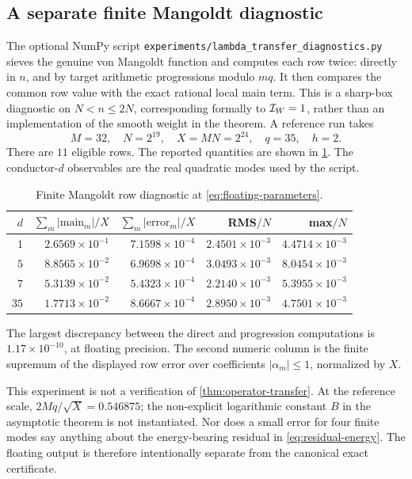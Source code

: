 \subsection{A separate finite Mangoldt diagnostic}

The optional NumPy script
\texttt{experiments/lambda\_transfer\_diagnostics.py} sieves the genuine
von Mangoldt function and computes each row twice: directly in $n$, and by
target arithmetic progressions modulo $mq$.  It then compares the common
row value with the exact rational local main term.  This is a sharp-box
diagnostic on $N<n\leq2N$, corresponding formally to $\mathcal I_W=1$, rather than
an implementation of the smooth weight in the theorem.  A reference run takes
\begin{equation}\label{eq:floating-parameters}
 M=32,
 \quad N=2^{19},
 \quad X=MN=2^{24},
 \quad q=35,
 \quad h=2.
\end{equation}
There are $11$ eligible rows.  The reported quantities are shown in
\cref{tab:floating-diagnostic}.  The conductor-$d$ observables are the real
quadratic modes used by the script.

\begin{table}[ht]
\centering
\caption{Finite Mangoldt row diagnostic at \eqref{eq:floating-parameters}.}
\label{tab:floating-diagnostic}
\begin{tabular}{@{}rrrrr@{}}
\toprule
$d$ & $\sum_m|\text{main}_m|/X$
    & $\sum_m|\text{error}_m|/X$
    & RMS$/N$ & max$/N$\\
\midrule
$1$  & $2.6569\times10^{-1}$ & $7.1598\times10^{-4}$
     & $2.4501\times10^{-3}$ & $4.4714\times10^{-3}$\\
$5$  & $8.8565\times10^{-2}$ & $6.9698\times10^{-4}$
     & $3.0493\times10^{-3}$ & $8.0454\times10^{-3}$\\
$7$  & $5.3139\times10^{-2}$ & $5.4323\times10^{-4}$
     & $2.2140\times10^{-3}$ & $5.3955\times10^{-3}$\\
$35$ & $1.7713\times10^{-2}$ & $8.6667\times10^{-4}$
     & $2.8950\times10^{-3}$ & $4.7501\times10^{-3}$\\
\bottomrule
\end{tabular}
\end{table}

The largest discrepancy between the direct and progression computations is
$1.17\times10^{-10}$, at floating precision.  The second numeric column is
the finite supremum of the displayed row error over coefficients
$|\alpha_m|\leq1$, normalized by $X$.

This experiment is not a verification of
\cref{thm:operator-transfer}.  At the reference scale,
$2Mq/\sqrt X=0.546875$; the non-explicit logarithmic constant $B$ in the
asymptotic theorem is not instantiated.  Nor does a small error for four
finite modes say anything about the energy-bearing residual in
\eqref{eq:residual-energy}.  The floating output is therefore intentionally
separate from the canonical exact certificate.

